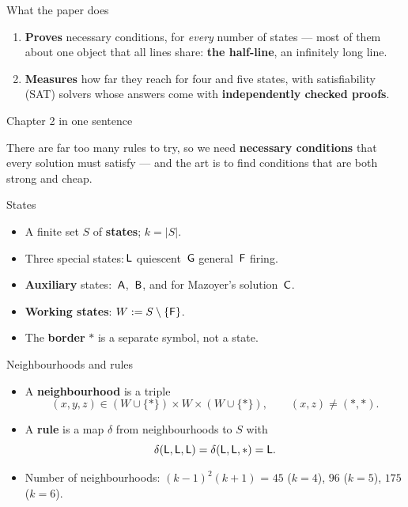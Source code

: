 \begin{frame}{What the paper does}
\begin{enumerate}
\item \textbf{Proves} necessary conditions, for \emph{every} number of states --- most of them about one object that all lines share: \textbf{the half-line}, an infinitely long line.
\item \textbf{Measures} how far they reach for four and five states, with satisfiability (SAT) solvers whose answers come with \textbf{independently checked proofs}.
\end{enumerate}
\end{frame}

\begin{frame}{Chapter 2 in one sentence}
\vspace{4ex}
\begin{plainbox}\large
There are far too many rules to try, so we need \textbf{necessary conditions} that every solution must satisfy --- and the art is to find conditions that are both strong and cheap.
\end{plainbox}
\end{frame}


\begin{frame}{States}
\begin{itemize}
\item A finite set $S$ of \textbf{states}; $k=|S|$.
\item Three special states:\quad {}\,$\mathsf L$ quiescent \quad {}\,$\mathsf G$ general \quad {}\,$\mathsf F$ firing.
\item \textbf{Auxiliary} states: \,$\mathsf A$, \,$\mathsf B$, and for Mazoyer's solution \,$\mathsf C$.
\item \textbf{Working states}: $W:=S\setminus\{\mathsf F\}$.
\item The \textbf{border} $\ast$ is a separate symbol, not a state.
\end{itemize}
\end{frame}

\begin{frame}{Neighbourhoods and rules}
\begin{itemize}
\item A \textbf{neighbourhood} is a triple
\[(x,y,z)\in(W\cup\{\ast\})\times W\times(W\cup\{\ast\}),\qquad (x,z)\ne(\ast,\ast).\]
\item A \textbf{rule} is a map $\delta$ from neighbourhoods to $S$ with
\[\delta(\mathsf L,\mathsf L,\mathsf L)=\delta(\mathsf L,\mathsf L,\ast)=\mathsf L.\]
\item Number of neighbourhoods: $(k-1)^2(k+1)$ = $45$ ($k=4$), $96$ ($k=5$), $175$ ($k=6$).
\end{itemize}
\end{frame}

